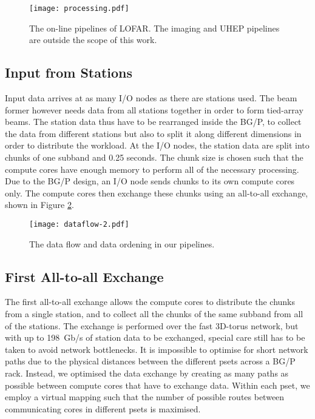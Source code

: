 \documentclass{llncs}
\begin{document}
\begin{figure}[ht]
\center
\texttt{[image: processing.pdf]}
\caption{The on-line pipelines of LOFAR. The imaging and UHEP pipelines are outside the scope of this work.}
\label{fig:processing}
\end{figure}

\subsection{Input from Stations}
Input data arrives at as many I/O nodes as there are stations used. The beam former however needs data from all stations together in order to form tied-array beams. The station data thus have to be rearranged inside the BG/P, to collect the data from different stations but also to split it along different dimensions in order to distribute the workload. At the I/O nodes, the station data are split into chunks of one subband and 0.25 seconds. The chunk size is chosen such that the compute cores have enough memory to perform all of the necessary processing. Due to the BG/P design, an I/O node sends chunks to its own compute cores only. The compute cores then exchange these chunks using an all-to-all exchange, shown in Figure \ref{fig:dataflow}.

\begin{figure}[ht]
\center
\texttt{[image: dataflow-2.pdf]}
\caption{The data flow and data ordening in our pipelines.}
\label{fig:dataflow}
\end{figure}

\subsection{First All-to-all Exchange}

The first all-to-all exchange allows the compute cores to distribute the chunks from a single station, and to collect all the chunks of the same subband from all of the stations. The exchange is performed over the fast 3D-torus network, but with up to 198~Gb/s of station data to be exchanged, special care still has to be taken to avoid network bottlenecks. It is impossible to optimise for short network paths due to the physical distances between the different psets across a BG/P rack. Instead, we optimised the data exchange by creating as many paths as possible between compute cores that have to exchange data. Within each pset, we employ a virtual mapping such that the number of possible routes between communicating cores in different psets is maximised.
\end{document}
